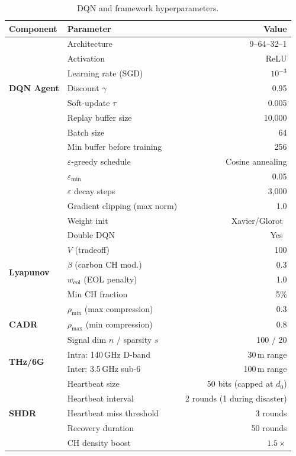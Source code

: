 \begin{table}[!t]
\centering
\caption{DQN and framework hyperparameters.}
\label{art2:tab:hyperparams}
\begin{tabular}{llr}
\toprule
Component & Parameter & Value \\
\midrule
\multirow{7}{*}{\textbf{DQN Agent}}
    & Architecture & 9--64--32--1 \\
    & Activation & ReLU \\
    & Learning rate (SGD) & $10^{-3}$ \\
    & Discount $\gamma$ & 0.95 \\
    & Soft-update $\tau$ & 0.005 \\
    & Replay buffer size & 10{,}000 \\
    & Batch size & 64 \\
    & Min buffer before training & 256 \\
    & $\varepsilon$-greedy schedule & Cosine annealing \\
    & $\varepsilon_{\min}$ & 0.05 \\
    & $\varepsilon$ decay steps & 3{,}000 \\
    & Gradient clipping (max norm) & 1.0 \\
    & Weight init & Xavier/Glorot~\cite{glorot2010xavier} \\
    & Double DQN & Yes~\cite{vanhasselt2016ddqn} \\
\midrule
\multirow{4}{*}{\textbf{Lyapunov}}
    & $V$ (tradeoff) & 100 \\
    & $\beta$ (carbon CH mod.) & 0.3 \\
    & $w_{\text{eol}}$ (EOL penalty) & 1.0 \\
    & Min CH fraction & 5\% \\
\midrule
\multirow{3}{*}{\textbf{CADR}}
    & $\rho_{\min}$ (max compression) & 0.3 \\
    & $\rho_{\max}$ (min compression) & 0.8 \\
    & Signal dim $n$ / sparsity $s$ & 100 / 20 \\
\midrule
\multirow{2}{*}{\textbf{THz/6G}}
    & Intra: 140\,GHz D-band & 30\,m range \\
    & Inter: 3.5\,GHz sub-6 & 100\,m range \\
\midrule
\multirow{5}{*}{\textbf{SHDR}}
    & Heartbeat size & 50 bits (capped at $d_0$) \\
    & Heartbeat interval & 2 rounds (1 during disaster) \\
    & Heartbeat miss threshold & 3 rounds \\
    & Recovery duration & 50 rounds \\
    & CH density boost & $1.5\times$ \\
\bottomrule
\end{tabular}
\end{table}

